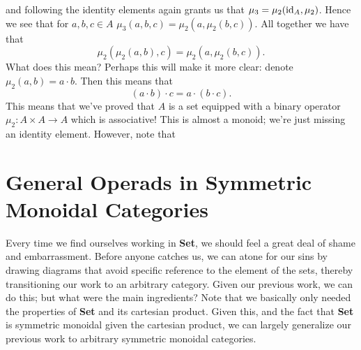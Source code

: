 \begin{example}
\begin{center}
    \end{center}
    and following the identity elements again grants us that 
    $\mu_3 = \mu_2(\operatorname{\mathrm{id}}_A, \mu_2)$. Hence we see that for $a, b ,c \in A$ 
    $\mu_3(a, b, c) = \mu_2(a, \mu_2(b, c))$. All together we have that 
    \[
        \mu_2(\mu_2(a, b), c) = \mu_2(a, \mu_2(b, c)).
    \]
    What does this mean? Perhaps this will make it more clear: denote $\mu_2(a,b) = a \cdot b$. 
    Then this means that 
    \[
        (a \cdot b) \cdot c = a \cdot (b \cdot c).
    \]
    This means that we've proved that $A$ is a set equipped with a binary operator $\mu_2: A \times A \to A$
    which is associative! This is almost a monoid; we're just missing an identity element. 
    However, note that 
\end{example}


\newpage
\section{General Operads in Symmetric Monoidal Categories}

Every time we find ourselves working in \textbf{Set}, we should feel a great 
deal of shame and embarrassment. Before anyone catches us, we can
atone for our sins by drawing diagrams that avoid specific reference 
to the element of the sets, thereby transitioning our work to an arbitrary category.
Given our previous work, we can do this; but what were the main ingredients? 
Note that we basically only needed the properties of \textbf{Set} and 
its cartesian product. Given this, and the fact that \textbf{Set} is symmetric 
monoidal given the cartesian product, we can largely generalize 
our previous work to arbitrary symmetric monoidal categories.

